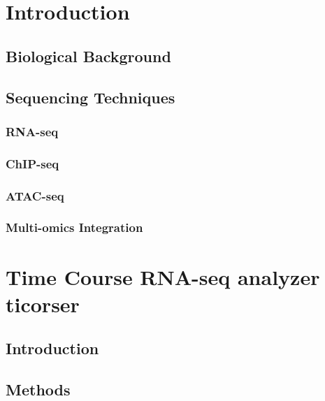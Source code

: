 \documentclass[b5paper,oneside,british,intoc,bibliograph=totoc,index=totoc,BCOR10mm,twoside,openright]{book}
\numberwithin{equation}{section}
\numberwithin{figure}{section}
\begin{document}

%
\newpage


\chapter{Introduction}

\section{Biological Background}

\section{Sequencing Techniques}\label{sec:seqs}

\subsection{RNA-seq} \label{sec:rnaseq}

\subsection{ChIP-seq} \label{sec:chipseq}

\subsection{ATAC-seq} \label{sec:atacseq}

\subsection{Multi-omics Integration} \label{sec:integration}



\chapter{Time Course RNA-seq analyzer \newline ticorser} \label{sec:ticorsercap}

\section{Introduction} \label{sec:ticorseintro}

\section{Methods} \label{sec:ticorseintromethods}

\end{document}
